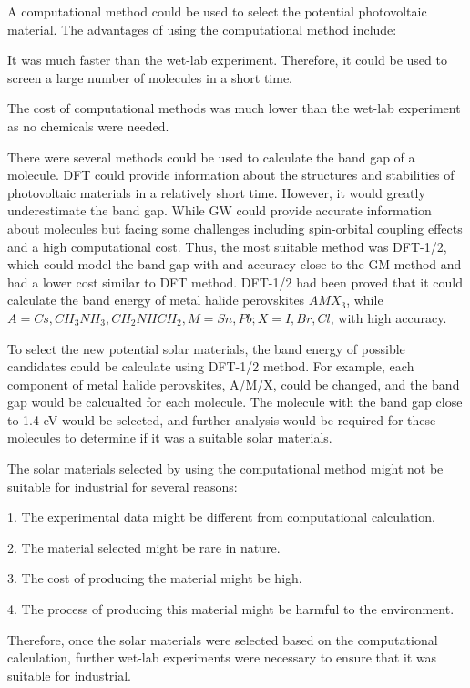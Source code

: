 \documentclass[twocolumn]{article} %
\let\tempthree\enumerate
\let\tempfour\endenumerate
\renewenvironment{enumerate}{\tempthree\setlength{\itemsep}{0pt}}{\tempfour}
\begin{document}
A computational method could be used to select the potential photovoltaic material. The advantages of using the computational method include:

\begin{enumerate}
      \item It was much faster than the wet-lab experiment. Therefore, it could be used to screen a large number of molecules in a short time.
      \item The cost of computational methods was much lower than the wet-lab experiment as no chemicals were needed. 
\end{enumerate}

There were several methods could be used to calculate the band gap of a molecule. DFT could provide information about the structures and stabilities of photovoltaic materials in a relatively short time. However, it would greatly underestimate the band gap. While GW could provide accurate information about molecules but facing some challenges including spin-orbital coupling effects and a high computational cost. Thus, the most suitable method was DFT-1/2, which could model the band gap with and accuracy close to the GM method and had a lower cost similar to DFT method. DFT-1/2 had been proved that it could calculate the band energy of metal halide perovskites $AMX_3$, while $A=Cs, CH_3NH_3, CH_2NHCH_2, M=Sn, Pb; X=I, Br, Cl$, with high accuracy. 

To select the new potential solar materials, the band energy of possible candidates could be calculate using DFT-1/2 method. For example, each component of metal halide perovskites, A/M/X, could be changed, and the band gap would be calcualted for each molecule. The molecule with the band gap close to 1.4 eV would be selected, and further analysis would be required for these molecules to determine if it was a suitable solar materials. 

The solar materials selected by using the computational method might not be suitable for industrial for several reasons:

1. The experimental data might be different from computational calculation.

2. The material selected might be rare in nature.

3. The cost of producing the material might be high.

4. The process of producing this material might be harmful to the environment. 

Therefore, once the solar materials were selected based on the computational calculation, further wet-lab experiments were necessary to ensure that it was suitable for industrial. 
\end{document}
